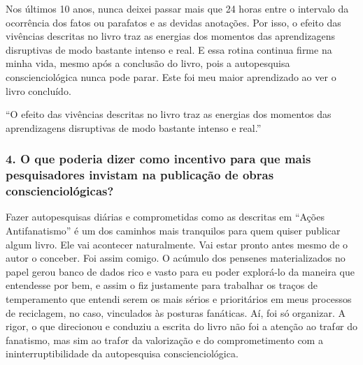 \documentclass{gescons}
\begin{document}
\begin{multicols}{2}
Nos últimos 10 anos, nunca deixei passar mais que 24 horas entre o intervalo da ocorrência dos fatos ou parafatos e as devidas anotações. Por isso, o efeito das vivências descritas no livro traz as energias dos momentos das aprendizagens disruptivas de modo bastante intenso e real. E essa rotina continua firme na minha vida, mesmo após a conclusão do livro, pois a autopesquisa conscienciológica nunca pode parar. Este foi meu maior aprendizado ao ver o livro concluído.

\begin{pullquote}
``O efeito das vivências descritas no livro traz as energias dos momentos das aprendizagens disruptivas de modo bastante intenso e real.''
\end{pullquote}


\subsubsection{4.       O que poderia dizer como incentivo para que mais pesquisadores invistam na publicação de obras conscienciológicas?}

Fazer autopesquisas diárias e comprometidas como as descritas em “Ações Antifanatismo” é um dos caminhos mais tranquilos para quem quiser publicar algum livro. Ele vai acontecer naturalmente. Vai estar pronto antes mesmo de o autor o conceber. Foi assim comigo. O acúmulo dos pensenes materializados no papel gerou banco de dados rico e vasto para eu poder explorá-lo da maneira que entendesse por bem, e assim o fiz justamente para trabalhar os traços de temperamento que entendi serem os mais sérios e prioritários em meus processos de reciclagem, no caso, vinculados às posturas fanáticas. Aí, foi só organizar. A rigor, o que direcionou e conduziu a escrita do livro não foi a atenção ao traf\textit{a}r do fanatismo, mas sim ao traf\textit{o}r da valorização e do comprometimento com a ininterruptibilidade da autopesquisa conscienciológica.


    
    
    \end{multicols}
\end{document}
